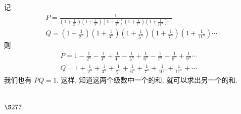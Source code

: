 记
\[
\begin{aligned}
& P=\frac{1}{\left(1+\frac{1}{2^{n}}\right)\left(1+\frac{1}{3^{n}}\right)\left(1+\frac{1}{5^{n}}\right)\left(1+\frac{1}{7^{n}}\right)\left(1+\frac{1}{11^{n}}\right) \cdots} \\
& Q=\left(1+\frac{1}{2^{n}}\right)\left(1+\frac{1}{3^{n}}\right)\left(1+\frac{1}{5^{n}}\right)\left(1+\frac{1}{7^{n}}\right)\left(1+\frac{1}{11^{n}}\right) \cdots
\end{aligned}
\]
则
\[
\begin{gathered}
P=1-\frac{1}{2^{n}}-\frac{1}{3^{n}}+\frac{1}{4^{n}}-\frac{1}{5^{n}}+\frac{1}{6^{n}}-\frac{1}{7^{n}}-\frac{1}{8^{n}}+\frac{1}{9^{n}} \cdots \\
Q=1+\frac{1}{2^{n}}+\frac{1}{3^{n}}+\frac{1}{5^{n}}+\frac{1}{6^{n}}+\frac{1}{7^{n}}+\frac{1}{10^{n}}+\frac{1}{11^{n}}+\cdots
\end{gathered}
\]
我们也有 $P Q=1$. 这样, 知道这两个级数中一个的和, 就可以求出另一个的和.

\section{$\S 277$}

